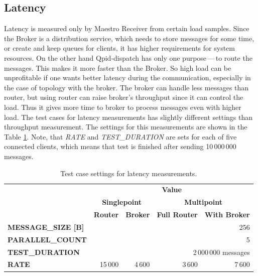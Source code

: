 \subsection{Latency}
\label{Latency}
Latency is measured only by Maestro Receiver from certain load samples. Since the Broker is a distribution service, which needs to store messages for some time, or create and keep queues for clients, it has higher requirements for system resources. On the other hand Qpid-dispatch has only one purpose\,---\,to route the messages. This makes it more faster than the Broker. So high load can be unprofitable if one wants better latency during the communication, especially in the case of topology with the broker. The broker can handle less messages than router, but using router can raise broker's throughput since it can control the load. Thus it gives more time to broker to process messages even with higher load. The test cases for latency measurements has slightly different settings than throughput measurement. The settings for this measurements are shown in the Table \ref{tab:test_case_latency}. Note, that \emph{RATE} and \emph{TEST\_DURATION} are sets for each of five connected clients, which means that test is finished after sending 10\,000\,000 messages.

\begingroup
\setlength{\tabcolsep}{10pt} %
\renewcommand{\arraystretch}{1.35} %
	\begin{table}[H]
	\centering
	\caption{Test case settings for latency measurements.}
	\label{tab:test_case_latency}
	\begin{tabular}{|l|r|r|r|r|}
	\hline
	\rowcolor[HTML]{C5E3DF}
	\cellcolor[HTML]{C5E3DF} & \multicolumn{4}{c|}{\cellcolor[HTML]{C5E3DF}\textbf{Value}} \\ \cline{2-5}
	\rowcolor[HTML]{C5E3DF}
	\cellcolor[HTML]{C5E3DF} & \multicolumn{2}{c|}{\cellcolor[HTML]{C5E3DF}\textbf{Singlepoint}} & \multicolumn{2}{c|}{\cellcolor[HTML]{C5E3DF}\textbf{Multipoint}} \\ \cline{2-5}
	\rowcolor[HTML]{C5E3DF}
	\multirow{-3}{*}{\cellcolor[HTML]{C5E3DF}\textbf{Test Property}} & \textbf{Router} & \textbf{Broker} & \textbf{Full Router} & \textbf{With Broker} \\ \hline
	\textbf{MESSAGE\_SIZE [B]} & \multicolumn{4}{r|}{256} \\ \hline
	\textbf{PARALLEL\_COUNT} & \multicolumn{4}{r|}{5} \\ \hline
	\textbf{TEST\_DURATION} & \multicolumn{4}{r|}{2\,000\,000 messages} \\ \hline
	\textbf{RATE} & 15\,000 & 4\,600 & 3\,600 & 7\,600 \\ \hline
	\end{tabular}
	\end{table}
\endgroup

